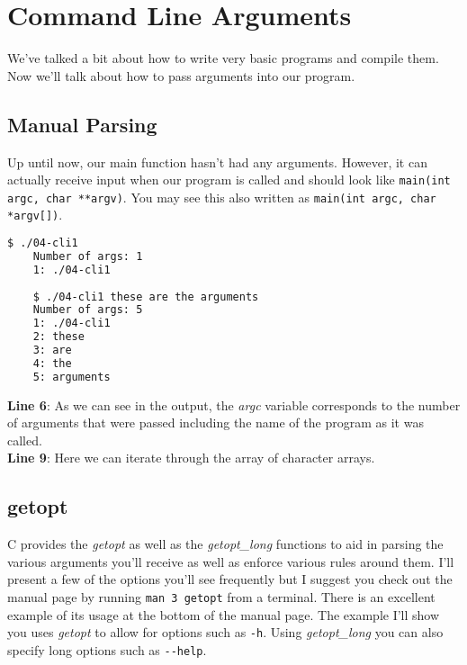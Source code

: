 \documentclass[../main.tex]{subfiles}
\begin{document}
	
	\chapter{Command Line Arguments}\label{chapter:cli}
	
	We've talked a bit about how to write very basic programs and compile them.  Now we'll talk about how to pass arguments into our program.  
	
	\section{Manual Parsing}
	Up until now, our main function hasn't had any arguments.  However, it can actually receive input when our program is called and should look like \texttt{main(int argc, char **argv)}.  You may see this also written as \texttt{main(int argc, char *argv[])}.\\

		
	
	\clearpage
	
	\begin{lstlisting}[language=bash, numbers=none]
	$ ./04-cli1 
	Number of args: 1
	1: ./04-cli1
	
	$ ./04-cli1 these are the arguments
	Number of args: 5
	1: ./04-cli1
	2: these
	3: are
	4: the
	5: arguments
	\end{lstlisting}
	
	\textbf{Line 6}: As we can see in the output, the \textit{argc} variable corresponds to the number of arguments that were passed including the name of the program as it was called. \\
	\textbf{Line 9}: Here we can iterate through the array of character arrays.
	
	\section{getopt}
	C provides the \textit{getopt} as well as the \textit{getopt\_long} functions to aid in parsing the various arguments you'll receive as well as enforce various rules around them.  I'll present a few of the options you'll see frequently but I suggest you check out the manual page by running \texttt{man 3 getopt} from a terminal.  There is an excellent example of its usage at the bottom of the manual page. The example I'll show you uses \textit{getopt} to allow for options such as \texttt{-h}.  Using \textit{getopt\_long} you can also specify long options such as \texttt{-{}-help}.  \\
	
\end{document}
